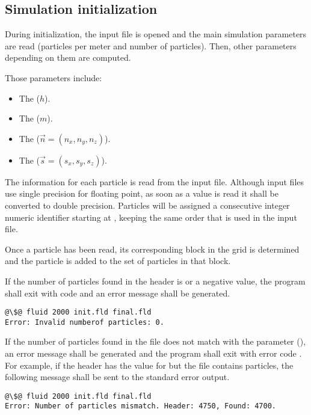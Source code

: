 \subsection{Simulation initialization}

During initialization, the input file is opened and the main simulation
parameters are read (particles per meter and number of particles).
Then, other parameters depending on them are computed.

Those parameters include:
\begin{itemize}
\item The  ($h$).
\item The  ($m$).
\item The  ($\vec{n} = (n_x, n_y, n_z)$).
\item The  ($\vec{s} = (s_x, s_y, s_z)$).
\end{itemize}

The information for each particle is read from the input file. Although input
files use single precision for floating point, as soon as a value is read it
shall be converted to double precision.  Particles will be assigned a consecutive
integer numeric identifier starting at , keeping the same order that
is used in the input file.

Once a particle has been read, its corresponding block in the grid is determined
and the particle is added to the set of particles in that block. 

If the number of particles found in the header is  or a negative value, 
the program shall exit with code  and an error message shall be 
generated.

\begin{lstlisting}[style=terminal,escapechar=@]
@\$@ fluid 2000 init.fld final.fld
Error: Invalid numberof particles: 0.
\end{lstlisting}

If the number of particles found in the file does not match with the parameter
 (), an error message shall be generated
and the program shall exit with error code . For example, if the 
header has the value  for  but the file contains 
 particles, the following message shall be sent to the standard
error output.

\begin{lstlisting}[style=terminal,escapechar=@]
@\$@ fluid 2000 init.fld final.fld
Error: Number of particles mismatch. Header: 4750, Found: 4700.
\end{lstlisting}

